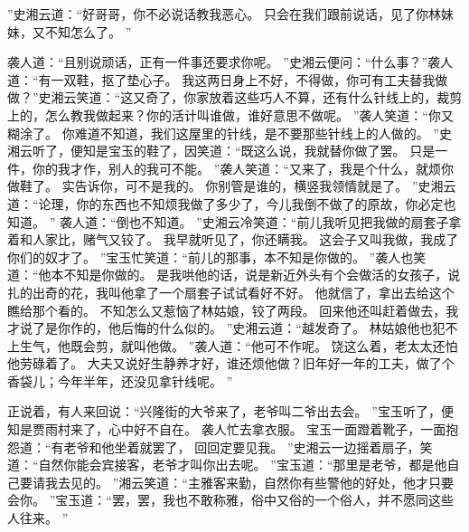 ”史湘云道：“好哥哥，你不必说话教我恶心。
只会在我们跟前说话，见了你林妹妹，又不知怎么了。
”\par
袭人道：“且别说顽话，正有一件事还要求你呢。
”史湘云便问：“什么事？”袭人道：“有一双鞋，抠了垫心子。
我这两日身上不好，不得做，你可有工夫替我做做？”史湘云笑道：“这又奇了，你家放着这些巧人不算，还有什么针线上的，裁剪上的，怎么教我做起来？你的活计叫谁做，谁好意思不做呢。
”袭人笑道：“你又糊涂了。
你难道不知道，我们这屋里的针线，是不要那些针线上的人做的。
”史湘云听了，便知是宝玉的鞋了，因笑道：“既这么说，我就替你做了罢。
只是一件，你的我才作，别人的我可不能。
”袭人笑道：“又来了，我是个什么，就烦你做鞋了。
实告诉你，可不是我的。
你别管是谁的，横竖我领情就是了。
”史湘云道：“论理，你的东西也不知烦我做了多少了，今儿我倒不做了的原故，你必定也知道。
”
袭人道：“倒也不知道。
”史湘云冷笑道：“前儿我听见把我做的扇套子拿着和人家比，赌气又铰了。
我早就听见了，你还瞒我。
这会子又叫我做，我成了你们的奴才了。
”宝玉忙笑道：“前儿的那事，本不知是你做的。
”袭人也笑道：“他本不知是你做的。
是我哄他的话，说是新近外头有个会做活的女孩子，说扎的出奇的花，我叫他拿了一个扇套子试试看好不好。
他就信了，拿出去给这个瞧给那个看的。
不知怎么又惹恼了林姑娘，铰了两段。
回来他还叫赶着做去，我才说了是你作的，他后悔的什么似的。
”史湘云道：“越发奇了。
林姑娘他也犯不上生气，他既会剪，就叫他做。
”袭人道：“他可不作呢。
饶这么着，老太太还怕他劳碌着了。
大夫又说好生静养才好，谁还烦他做？旧年好一年的工夫，做了个香袋儿；今年半年，还没见拿针线呢。
”\par
正说着，有人来回说：“兴隆街的大爷来了，老爷叫二爷出去会。
”宝玉听了，便知是贾雨村来了，心中好不自在。
袭人忙去拿衣服。
宝玉一面蹬着靴子，一面抱怨道：“有老爷和他坐着就罢了，
回回定要见我。
”史湘云一边摇着扇子，笑道：“自然你能会宾接客，老爷才叫你出去呢。
”宝玉道：“那里是老爷，都是他自己要请我去见的。
”湘云笑道：“主雅客来勤，自然你有些警他的好处，他才只要会你。
”宝玉道：“罢，罢，我也不敢称雅，俗中又俗的一个俗人，并不愿同这些人往来。
”\par

